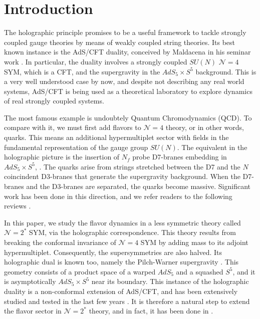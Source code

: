 \section{Introduction}

The holographic principle promises to be a useful framework to tackle strongly coupled gauge theories by means of weakly coupled string theories. Its best known instance is the AdS/CFT duality, conceived by Maldacena in his seminar work \cite{Maldacena:1997re}. In particular, the duality involves a strongly coupled $SU(N)$ $\mathcal{N}=4$ SYM, which is a CFT, and the supergravity in the $AdS_5 \times S^5$ background. This is a very well understood case by now, and despite not describing any real world systems, AdS/CFT is being used as a theoretical laboratory to explore dynamics of real strongly coupled systems.

The most famous example is undoubtely Quantum Chromodynamics (QCD). To compare with it, we must first add flavors to $\mathcal{N}=4$ theory,  or in other words, quarks. This means an additional hypermultiplet sector with fields in the fundamental representation of the gauge group $SU(N)$. The equivalent in the holographic picture is the insertion of $N_f$ probe D7-branes embedding in $AdS_5 \times S^5$, \cite{Karch:2002sh}. The quarks arise from strings stretched between the D7 and the $N$ coincindent D3-branes that generate the supergravity background. When the D7-branes and the D3-branes are separated, the quarks become massive. Significant work has been done in this direction, and we refer readers to the following reviews \cite{CasalderreySolana:2011us, Erdmenger:2007cm}.

In this paper, we study the flavor dynamics in a less symmetric theory called $\mathcal{N}=2^*$ SYM, via the holographic correspondence. This theory results from breaking the conformal invariance of $\mathcal{N}=4$ SYM by adding mass to its adjoint hypermultiplet. Consequently, the supersymmetries are also halved. Its holographic dual is known too, namely the Pilch-Warner supergravity \cite{Pilch:2000ue, Pilch:2003jg}. This geometry consists of a product space of a warped $AdS_5$ and a squashed $S^5$, and it is asymptotically $AdS_5 \times S^5$ near its boundary. This instance of the holographic duality is a non-conformal extension of AdS/CFT, and has been extensively studied and tested in the last few years \cite{Buchel:2013id, Chen-Lin:2015xlh, Chen-Lin:2017pay, Russo:2019lgq}. It is therefore a natural step to extend the flavor sector in $\mathcal{N}=2^*$ theory, and in fact, it has been done in \cite{Albash:2011nw}. 

